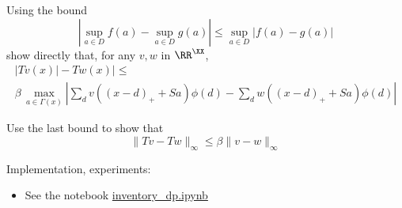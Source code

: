 \begin{frame}

    \Ex Using the bound
    \begin{equation*}
        |\sup_{a \in D} f(a) - \sup_{a \in D} g(a) |
            \leq \sup_{a \in D} | f(a) - g(a) |
    \end{equation*}
    show directly that, for any $v, w$ in $\RR^\XX$,
    \begin{multline*}
        |T v(x)| -T w(x)|
        \leq
        \\
        \beta \,
        \max_{a \in \Gamma(x)}
        \left| 
            \sum_{d } v((x - d)_+ + Sa) \phi(d)
            -
            \sum_{d } w((x - d)_+ + Sa) \phi(d)
        \right|
    \end{multline*}

    \Ex Use the last bound to show that
    \begin{equation*}
        \|T v -T w \|_\infty \leq \beta \| v - w\|_\infty
    \end{equation*}

\end{frame}



\begin{frame}

    Implementation, experiments:

    \begin{itemize}
        \item See the notebook \url{inventory_dp.ipynb}
    \end{itemize}
    
\end{frame}



